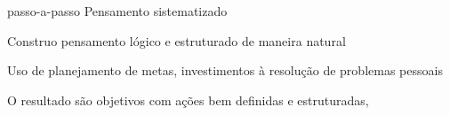 \begin{cventries}
	\cventry
		{passo-a-passo} %
		{Pensamento sistematizado} %
		{} %
		{} %
		{
			\begin{cvitems} %
				\item {Construo pensamento lógico e estruturado de maneira natural}
				\item {Uso de planejamento de metas, investimentos à resolução de problemas pessoais}
				\item {O resultado são objetivos com ações bem definidas e estruturadas, 
				}
			\end{cvitems}
		}

\end{cventries}
